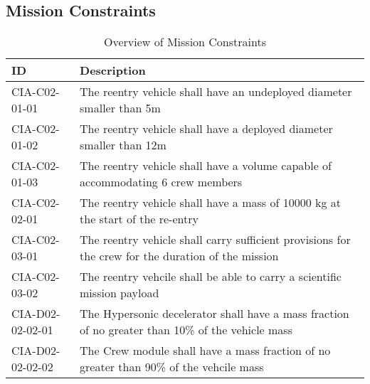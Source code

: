 \subsection{Mission Constraints} \label{sec:MisCon}
\begin{table}[H]
	\caption{Overview of Mission Constraints}
	\begin{tabular}{|p{}|p{}|}
    \hline
    ID          & Description                                                                                                      \\ \hline \hline
		CIA-C02-01-01 & The reentry vehicle shall have an undeployed diameter smaller than 5m                         				            \\ \hline
		CIA-C02-01-02 & The reentry vehicle shall have a deployed diameter smaller than 12m                         				            \\ \hline
		CIA-C02-01-03 & The reentry vehicle shall have a volume capable of accommodating 6 crew members                        				            \\ \hline
		CIA-C02-02-01 & The reentry vehicle shall have a mass of 10000 kg at the start of the re-entry                       				            \\ \hline
		CIA-C02-03-01 & The reentry vehicle shall carry sufficient provisions for the crew for the duration of the mission
		\\ \hline
		CIA-C02-03-02 & The reentry vehcile shall be able to carry a scientific mission payload								\\ \hline
		CIA-D02-02-02-01 & The Hypersonic decelerator shall have a mass fraction of no greater than 10\% of the vehicle mass  \\ \hline
		CIA-D02-02-02-02 & The Crew module shall have a mass fraction of no greater than 90\% of the vehcile mass \\ \hline
		
		\end{tabular}
    \label{tab:MissionCon}
\end{table}